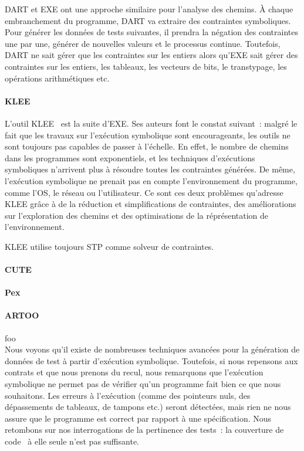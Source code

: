 DART et EXE ont une approche similaire pour l'analyse des chemins. À chaque
embranchement du programme, DART va extraire des contraintes symboliques. Pour
générer les données de tests suivantes, il prendra la négation des contraintes
une par une, générer de nouvelles valeurs et le processus continue. Toutefois,
DART ne sait gérer que les contraintes sur les entiers alors qu'EXE sait gérer
des contraintes sur les entiers, les tableaux, les vecteurs de bits, le
transtypage, les opérations arithmétiques etc.

\paragraph{KLEE} L'outil KLEE~ est la suite d'EXE. Ses auteurs
font le constat suivant~: malgré le fait que les travaux sur l'exécution
symbolique sont encourageants, les outils ne sont toujours pas capables de
passer à l'échelle. En effet, le nombre de chemins dans les programmes sont
exponentiels, et les techniques d'exécutions symboliques n'arrivent plus à
résoudre toutes les contraintes générées. De même, l'exécution symbolique ne
prenait pas en compte l'environnement du programme, comme l'OS, le réseau ou
l'utilisateur. Ce sont ces deux problèmes qu'adresse KLEE grâce à de la
réduction et simplifications de contraintes, des améliorations sur l'exploration
des chemins et des optimisations de la réprésentation de l'environnement.

KLEE utilise toujours STP comme solveur de contraintes.

\paragraph{CUTE} 

\paragraph{Pex} 

\paragraph{ARTOO} foo \\

Nous voyons qu'il existe de nombreuses techniques avancées pour la génération de
données de test à partir d'exécution symbolique. Toutefois, si nous repensons
aux contrats et que nous prenons du recul, nous remarquons que l'exécution
symbolique ne permet pas de vérifier qu'un programme fait bien ce que nous
souhaitons. Les erreurs à l'exécution (comme des pointeurs nuls, des
dépassements de tableaux, de tampons etc.) seront détectées, mais rien ne nous
assure que le programme est correct par rapport à une spécification. Nous
retombons sur nos interrogations de la pertinence des tests~: la couverture de
code~ à elle seule n'est pas suffisante.

